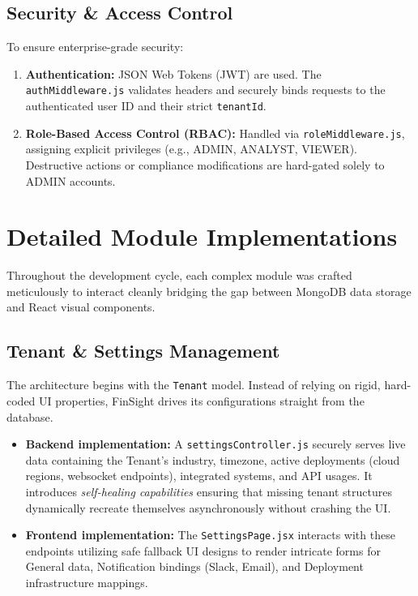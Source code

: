 \documentclass[12pt,a4paper]{report}
\begin{document}
\section{Security \& Access Control}
To ensure enterprise-grade security:
\begin{enumerate}
    \item \textbf{Authentication:} JSON Web Tokens (JWT) are used. The \texttt{authMiddleware.js} validates headers and securely binds requests to the authenticated user ID and their strict \texttt{tenantId}.
    \item \textbf{Role-Based Access Control (RBAC):} Handled via \texttt{roleMiddleware.js}, assigning explicit privileges (e.g., ADMIN, ANALYST, VIEWER). Destructive actions or compliance modifications are hard-gated solely to ADMIN accounts.
\end{enumerate}

\chapter{Detailed Module Implementations}
Throughout the development cycle, each complex module was crafted meticulously to interact cleanly bridging the gap between MongoDB data storage and React visual components.

\section{Tenant \& Settings Management}
The architecture begins with the \texttt{Tenant} model. Instead of relying on rigid, hard-coded UI properties, FinSight drives its configurations straight from the database. 
\begin{itemize}
    \item \textbf{Backend implementation:} A \texttt{settingsController.js} securely serves live data containing the Tenant's industry, timezone, active deployments (cloud regions, websocket endpoints), integrated systems, and API usages. It introduces \textit{self-healing capabilities} ensuring that missing tenant structures dynamically recreate themselves asynchronously without crashing the UI.
    \item \textbf{Frontend implementation:} The \texttt{SettingsPage.jsx} interacts with these endpoints utilizing safe fallback UI designs to render intricate forms for General data, Notification bindings (Slack, Email), and Deployment infrastructure mappings.
\end{itemize}
\end{document}
